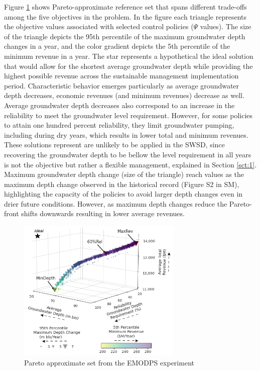 \documentclass[a4paper,fleqn]{cas-sc}
\begin{document}
Figure \ref{fig:5} shows Pareto-approximate reference set that spans different trade-offs among the five objectives in the problem. In the figure each triangle represents the objective values associated with selected control policies ($\Psi$ values). The size of the triangle depicts the 95th percentile of the maximum groundwater depth changes in a year, and the color gradient depicts the 5th percentile of the minimum revenue in a year. The star represents a hypothetical the ideal solution that would allow for the shortest average groundwater depth while providing the highest possible revenue across the sustainable management implementation period. Characteristic behavior emerges particularly as average groundwater depth decreases, economic revenues (and minimum revenues) decrease as well. Average groundwater depth decreases also correspond to an increase in the reliability to meet the groundwater level requirement. However, for some policies to attain one hundred percent reliability, they limit groundwater pumping, including during dry years, which results in lower total and minimum revenues. These solutions represent are unlikely to be applied in the SWSD, since recovering the groundwater depth to be bellow the level requirement in all years is not the objective but rather a flexible management, explained in Section \ref{sct:1}. Maximum groundwater depth change (size of the triangle) reach values as the maximum depth change observed in the historical record (Figure S2 in SM), highlighting the capacity of the policies to avoid larger depth changes even in drier future conditions. However, as maximum depth changes reduce the Pareto-front shifts downwards resulting in lower average revenues. 

\begin{figure}[htb!]
    \includegraphics[width=0.7\textwidth,center]{./figs/3d_plot.png}
    \caption{Pareto approximate set from the EMODPS experiment} \label{fig:5}
\end{figure}
\end{document}
